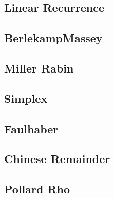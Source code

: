 \documentclass[a4paper,10pt,twocolumn,oneside]{article}
\begin{document}
%

\subsection{Linear Recurrence}


\subsection{BerlekampMassey}


\subsection{Miller Rabin}


%

\subsection{Simplex}


\subsection{Faulhaber}


\subsection{Chinese Remainder}


\subsection{Pollard Rho}


%
\end{document}
